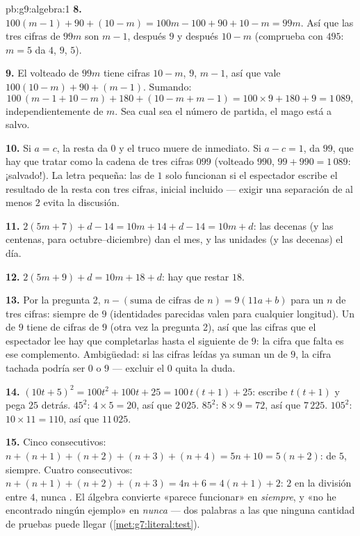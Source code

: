 \begin{solution}{pb:g9:algebra:1}
\textbf{8.} $100(m - 1) + 90 + (10 - m) = 100m - 100 + 90 + 10
- m = 99m$. Así que las tres cifras de $99m$ son $m - 1$, después $9$
y después $10 - m$ (comprueba con $495$: $m = 5$ da $4$, $9$, $5$).

\textbf{9.} El volteado de $99m$ tiene cifras $10 - m$, $9$,
$m - 1$, así que vale $100(10 - m) + 90 + (m - 1)$. Sumando:
\[
100\,(m - 1 + 10 - m) + 180 + (10 - m + m - 1)
= 100 \times 9 + 180 + 9 = 1\,089 ,
\]
independientemente de $m$. Sea cual sea el número de partida, el mago
está a salvo.

\textbf{10.} Si $a = c$, la resta da $0$ y el truco
muere de inmediato. Si $a - c = 1$, da $99$, que hay que
tratar como la cadena de tres cifras $099$ (volteado $990$,
$99 + 990 = 1\,089$: ¡salvado!). La letra pequeña: las  de
$1$ solo funcionan si el espectador escribe el resultado de la resta
con tres cifras,  inicial incluido --- exigir una separación de
al menos $2$ evita la discusión.

\textbf{11.} $2(5m + 7) + d - 14 = 10m + 14 + d - 14 =
10m + d$: las decenas (y las centenas, para octubre--diciembre) dan
el mes, y las unidades (y las decenas) el día.

\textbf{12.} $2(5m + 9) + d = 10m + 18 + d$: hay que restar $18$.

\textbf{13.} Por la pregunta 2, $n - (\text{suma de cifras de } n) =
9(11a + b)$ para un $n$ de tres cifras: siempre  de $9$
(identidades parecidas valen para cualquier longitud). Un  de $9$ tiene
 de cifras  de $9$ (otra vez la pregunta 2), así que las cifras
que el espectador lee hay que completarlas hasta el siguiente 
de $9$: la cifra que falta es ese complemento. Ambigüedad: si las
cifras leídas ya suman un  de $9$, la cifra tachada
podría ser $0$ o $9$ --- excluir el $0$ quita la duda.

\textbf{14.} $(10t + 5)^2 = 100t^2 + 100t + 25 =
100\,t(t + 1) + 25$: escribe $t(t+1)$ y pega $25$ detrás.
$45^2$: $4 \times 5 = 20$, así que $2\,025$. $85^2$:
$8 \times 9 = 72$, así que $7\,225$. $105^2$: $10 \times 11 = 110$,
así que $11\,025$.

\textbf{15.} Cinco consecutivos: $n + (n+1) + (n+2) + (n+3) +
(n+4) = 5n + 10 = 5(n + 2)$:  de $5$, siempre. Cuatro
consecutivos: $n + (n+1) + (n+2) + (n+3) = 4n + 6 =
4(n + 1) + 2$:  $2$ en la división entre $4$, nunca
. El álgebra convierte «parece funcionar» en
\emph{siempre}, y «no he encontrado ningún ejemplo» en \emph{nunca} ---
dos palabras a las que ninguna cantidad de pruebas puede llegar
(\cref{met:g7:literal:test}).
\end{solution}
